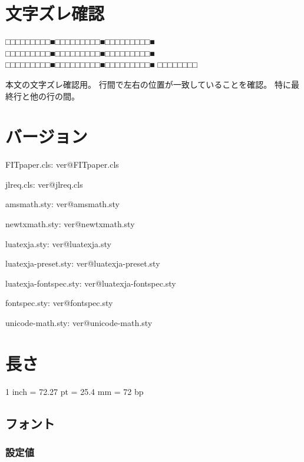 \documentclass{FITpaper}
\begin{document}
\maketitle

\section{文字ズレ確認}

□□□□□□□□□■□□□□□□□□□■□□□□□□□□□■
□□□□□□□□□■□□□□□□□□□■□□□□□□□□□■
□□□□□□□□□■□□□□□□□□□■□□□□□□□□□■
□□□□□□□□

本文の文字ズレ確認用。
行間で左右の位置が一致していることを確認。
特に最終行と他の行の間。

\section{バージョン}

\makeatletter
FITpaper.cls: \csname ver@FITpaper.cls\endcsname\par
jlreq.cls: \csname ver@jlreq.cls\endcsname\par
amsmath.sty: \csname ver@amsmath.sty\endcsname\par
\ifx\luatexversion\@undefined
newtxmath.sty: \csname ver@newtxmath.sty\endcsname\par
\else
luatexja.sty: \csname ver@luatexja.sty\endcsname\par
luatexja-preset.sty: \csname ver@luatexja-preset.sty\endcsname\par
luatexja-fontspec.sty: \csname ver@luatexja-fontspec.sty\endcsname\par
fontspec.sty: \csname ver@fontspec.sty\endcsname\par
unicode-math.sty: \csname ver@unicode-math.sty\endcsname\par
\fi
\makeatother

\section{長さ}

1 inch = 72.27 pt = 25.4 mm = 72 bp

\subsection{フォント}

\subsubsection{設定値}
\end{document}
